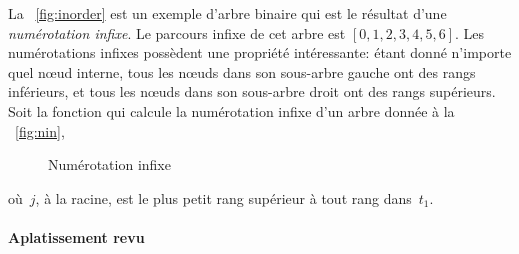La \fig~\vref{fig:inorder} est un exemple d'arbre binaire qui est le
résultat d'une \emph{numérotation infixe}. Le parcours infixe de cet arbre est
\([0,1,2,3,4,5,6]\). Les numérotations infixes possèdent une propriété
intéressante: étant donné n'importe quel n{\oe}ud interne, tous les
n{\oe}uds dans son sous-arbre gauche ont des rangs inférieurs, et tous
les n{\oe}uds dans son sous-arbre droit ont des rangs supérieurs.
Soit  la
fonction qui calcule la numérotation infixe d'un arbre donnée à la
\fig~\vref{fig:nin},
\begin{figure}[b]
\centering
{}
\caption{Numérotation infixe\label{fig:nin}}
\end{figure}
où~\(j\), à la racine, est le plus petit rang supérieur à tout
rang dans~\(t_1\).

\paragraph{Aplatissement revu}
\label{par:rotation}


